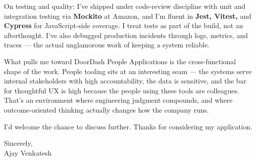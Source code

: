 \documentclass[letterpaper,11pt]{article}
\begin{document}
On testing and quality: I've shipped under code-review discipline with unit and integration testing via \textbf{Mockito} at Amazon, and I'm fluent in \textbf{Jest, Vitest,} and \textbf{Cypress} for JavaScript-side coverage. I treat tests as part of the build, not an afterthought. I've also debugged production incidents through logs, metrics, and traces --- the actual unglamorous work of keeping a system reliable.

What pulls me toward DoorDash People Applications is the cross-functional shape of the work. People tooling sits at an interesting seam --- the systems serve internal stakeholders with high accountability, the data is sensitive, and the bar for thoughtful UX is high because the people using these tools are colleagues. That's an environment where engineering judgment compounds, and where outcome-oriented thinking actually changes how the company runs.

I'd welcome the chance to discuss further. Thanks for considering my application.

\vspace{12pt}

Sincerely, \\
Ajay Venkatesh
\end{document}
